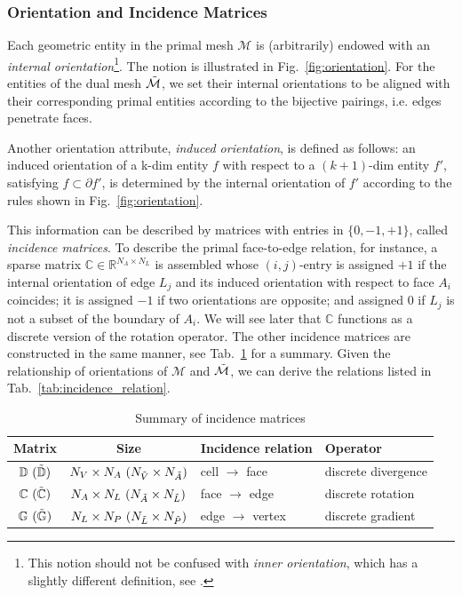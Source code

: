 \documentclass{article}
\begin{document}
\subsubsection{Orientation and Incidence Matrices}

Each geometric entity in the primal mesh $\mathcal{M}$ is (arbitrarily) endowed with an
\emph{internal orientation}\footnote{This notion should not be confused with \emph{inner
    orientation}, which has a slightly different definition, see
  \cite[][Sec.~3.1]{tonti_2002}.}. The notion is illustrated in
Fig.~\ref{fig:orientation}. For the entities of the dual mesh $\Tilde{\mathcal{M}}$, we
set their internal orientations to be aligned with their corresponding primal entities
according to the bijective pairings, i.e. edges penetrate faces.

Another orientation attribute, \emph{induced orientation}, is defined as follows: an induced orientation of a k-dim entity $f$ with respect to a $(k+1)$-dim entity $f'$, satisfying $f \subset \partial f' $, is determined by the internal orientation of $f'$ according to the rules shown in Fig.~\ref{fig:orientation}. 

This information can be described by matrices with entries in $\{0,-1,+1\}$, called \emph{incidence matrices}. To describe the primal face-to-edge relation, for instance, a sparse matrix $\mathbb{C} \in \mathbb{R}^{N_A \times N_L}$ is assembled whose $(i,j)$-entry is assigned $+1$ if the internal orientation of edge $L_j$ and its induced orientation with respect to face $A_i$ coincides; it is assigned $-1$ if two orientations are opposite; and assigned $0$ if $L_j$ is not a subset of the boundary of $A_i$. We will see later that $\mathbb{C}$ functions as a discrete version of the rotation operator. The other incidence matrices are constructed in the same manner, see Tab.~\ref{tab:incidence_mat} for a summary. Given the relationship of orientations of $\mathcal{M}$ and $\Tilde{\mathcal{M}}$, we can derive the relations listed in Tab.~\ref{tab:incidence_relation}.  

\begin{table}[h!]
    \centering
    \begin{tabular}{c c l l}
    \hline
         Matrix & Size & Incidence relation & Operator  \\
    \hline
         $\mathbb{D}\ (\Tilde{\mathbb{D}})$ & $N_V \times N_A\ (N_{\Tilde{V}} \times N_{\Tilde{A}})$ & cell $\rightarrow$ face & discrete divergence \\
         $\mathbb{C}\ (\Tilde{\mathbb{C}})$ & $N_A \times N_L\ (N_{\Tilde{A}} \times N_{\Tilde{L}})$ & face $\rightarrow$ edge & discrete rotation \\
         $\mathbb{G}\ (\Tilde{\mathbb{G}})$ & $N_L \times N_P\ (N_{\Tilde{L}} \times N_{\Tilde{P}})$ & edge $\rightarrow$ vertex & discrete gradient
         \\
    \hline
    \end{tabular}
    \caption{Summary of incidence matrices}
    \label{tab:incidence_mat}
\end{table}
\end{document}

